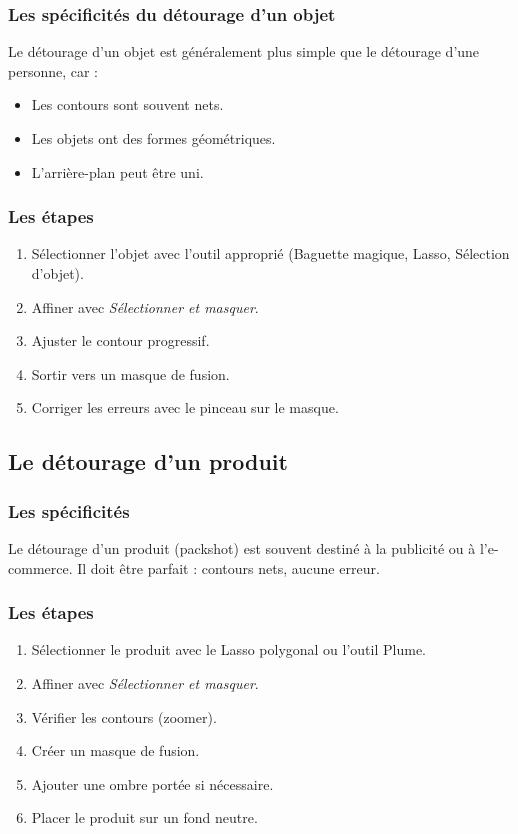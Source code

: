 \subsubsection{Les spécificités du détourage d'un objet}

Le détourage d'un objet est généralement plus simple que le détourage d'une personne, car :

\begin{itemize}
    \item Les contours sont souvent nets.
    \item Les objets ont des formes géométriques.
    \item L'arrière-plan peut être uni.
\end{itemize}

\subsubsection{Les étapes}

\begin{enumerate}
    \item Sélectionner l'objet avec l'outil approprié (Baguette magique, Lasso, Sélection d'objet).
    \item Affiner avec \emph{Sélectionner et masquer}.
    \item Ajuster le contour progressif.
    \item Sortir vers un masque de fusion.
    \item Corriger les erreurs avec le pinceau sur le masque.
\end{enumerate}

\subsection{Le détourage d'un produit}

\subsubsection{Les spécificités}

Le détourage d'un produit (packshot) est souvent destiné à la publicité ou à l'e-commerce. Il doit être parfait : contours nets, aucune erreur.

\subsubsection{Les étapes}

\begin{enumerate}
    \item Sélectionner le produit avec le Lasso polygonal ou l'outil Plume.
    \item Affiner avec \emph{Sélectionner et masquer}.
    \item Vérifier les contours (zoomer).
    \item Créer un masque de fusion.
    \item Ajouter une ombre portée si nécessaire.
    \item Placer le produit sur un fond neutre.
\end{enumerate}

